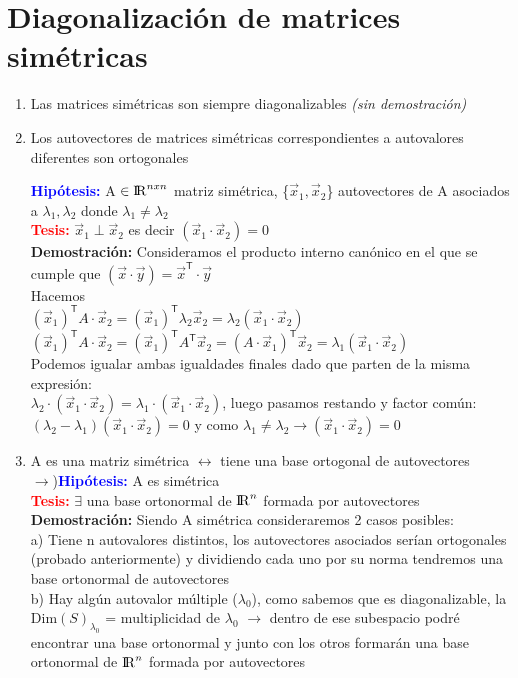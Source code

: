 \documentclass{article}
\begin{document}
\section{Diagonalización de matrices simétricas}
\begin{enumerate}
\item Las matrices simétricas son siempre diagonalizables \textit{(sin demostración)}
\item Los autovectores de matrices simétricas correspondientes a autovalores diferentes son ortogonales 

{\bfseries \textcolor{blue}{Hipótesis:}} A $\in {\rm I\!R}^{nxn}$ matriz simétrica, \{$\vec{x}_{1}, \vec{x}_2$\} autovectores de A asociados a $\lambda_{1}, \lambda_{2}$ donde $\lambda_{1} \neq \lambda_{2}$\\
{\bfseries \textcolor{red}{Tesis:}} $\vec{x}_{1} \perp \vec{x}_2$ es decir $(\vec{x}_1\cdot\vec{x}_2)=0$\\
\textbf{Demostración:} Consideramos el producto interno canónico en el que se cumple que $(\vec{x}\cdot\vec{y}) = \vec{x}^\mathsf{T}\cdot\vec{y}$\\
Hacemos \\
$(\vec{x}_1)^\mathsf{T}A\cdot\vec{x}_2=(\vec{x}_1)^\mathsf{T}\lambda_2\vec{x}_2=\lambda_2(\vec{x}_1\cdot\vec{x}_2)$\\
$(\vec{x}_1)^\mathsf{T}A \cdot \vec{x}_2=(\vec{x}_1)^\mathsf{T} A^\mathsf{T} \vec{x}_2 =(A\cdot\vec{x}_1)^\mathsf{T}\vec{x}_2=\lambda_1(\vec{x}_1\cdot\vec{x}_2)$\\
Podemos igualar ambas igualdades finales dado que parten de la misma expresión:\\
$\lambda_2\cdot(\vec{x}_1\cdot\vec{x}_2)=\lambda_1\cdot(\vec{x}_1\cdot\vec{x}_2)$, luego pasamos restando y factor común: \\
$(\lambda_2-\lambda_1)(\vec{x}_1\cdot\vec{x}_2)=0$ y como $\lambda_1 \neq \lambda_2 \rightarrow (\vec{x}_1\cdot\vec{x}_2)=0$
\item A es una matriz simétrica $\leftrightarrow$ tiene una base ortogonal de autovectores\\
$\rightarrow$){\bfseries \textcolor{blue}{Hipótesis:}} A es simétrica\\
{\bfseries \textcolor{red}{Tesis:}} $\exists$ una base ortonormal de ${\rm I\!R}^{n}$ formada por autovectores\\
\textbf{Demostración:} Siendo A simétrica consideraremos 2 casos posibles:\\
a) Tiene n autovalores distintos, los autovectores asociados serían ortogonales (probado anteriormente) y dividiendo cada uno por su norma tendremos una base ortonormal de autovectores \\
b) Hay algún autovalor múltiple ($\lambda_0$), como sabemos que es diagonalizable, la Dim$(S)_{\lambda_{0}}$ = multiplicidad de $\lambda_0$ $\rightarrow$ dentro de ese subespacio podré encontrar una base ortonormal y junto con los otros formarán una base ortonormal de ${\rm I\!R}^{n}$ formada por autovectores


\end{enumerate}
\end{document}
